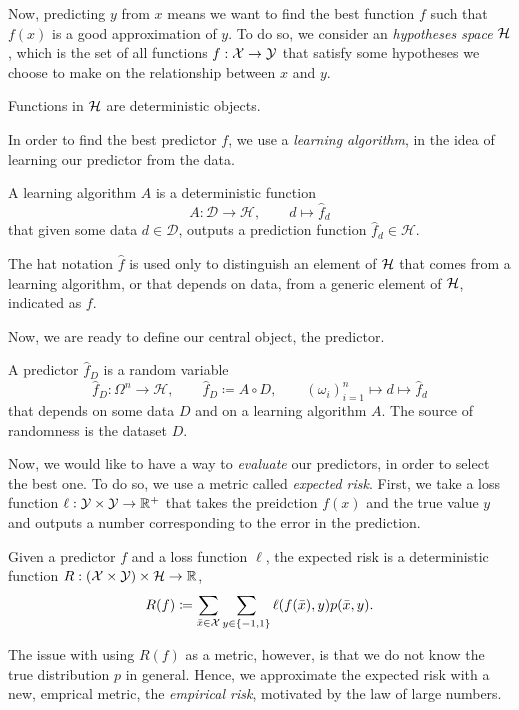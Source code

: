 \documentclass[reqno]{amsart}
\begin{document}
Now, predicting $y$ from $x$ means we want to find the best function $f$ such that $f(x)$ is a good approximation of $y$. To do so, we consider an {\it\/hypotheses space} $\mathcal{H}$, which is the set of all functions $f:\mathcal{X}\to\mathcal{Y}$ that satisfy some hypotheses we choose to make on the relationship between $x$ and $y$.
\begin{fact}
    Functions in $\mathcal{H}$ are deterministic objects.
\end{fact}

In order to find the best predictor $f$, we use a {\it\/learning algorithm}, in the idea of learning our predictor from the data. 

\begin{definition}\label{1def: learningalg}
A learning algorithm $A$ is a deterministic function
\[
A:\mathcal D \to \mathcal H, \qquad d \mapsto \hat f_d
\]
that given some data $d\in \mathcal{D}$, outputs a prediction function $\hat f_d\in \mathcal{H}$.
\end{definition}

\begin{remark}
    The hat notation $\hat f$ is used only to distinguish an element of $\mathcal{H}$ that comes from a learning algorithm, or that depends on data, from a generic element of $\mathcal{H}$, indicated as $f$. 
\end{remark}

Now, we are ready to define our central object, the predictor. 
\begin{definition}[Predictor]
    A predictor $\hat f_D$ is a random variable 
    \[
    \hat f_D : \Omega^n  \to \mathcal H, \qquad \hat f_D \coloneq A \circ D, \qquad {(\omega_i)}_{i=1}^n\mapsto d \mapsto \hat f_d
    \]
    that depends on some data $D$ and on a learning algorithm $A$. The source of randomness is the dataset $D$.  
\end{definition}

Now, we would like to have a way to {\it\/ evaluate} our predictors, in order to select the best one. To do so, we use a metric called {\it\/expected risk}. First, we take a loss function $\ell:\mathcal{Y}\times\mathcal{Y}\to\mathbb{R}^+$ that takes the preidction $f(x)$ and the true value $y$ and outputs a number corresponding to the error in the prediction. 

\begin{definition}
     Given a predictor $f$ and a loss function $\ell$, the expected risk is a deterministic function $R: (\mathcal{X}\times\mathcal{Y}) \times \mathcal{H} \to \mathbb{R}$,
    \begin{equation}
        R(f) \coloneq \sum_{\bar x \in \mathcal{X}} \sum_{y\in\{-1,1\}}\ell(f(\bar x),y)p(\bar x, y).
    \end{equation}
\end{definition}
The issue with using $R(f)$ as a metric, however, is that we do not know the true distribution $p$ in general. Hence, we approximate the expected risk with a new, emprical metric, the {\it\/empirical risk}, motivated by the law of large numbers. 
\end{document}
